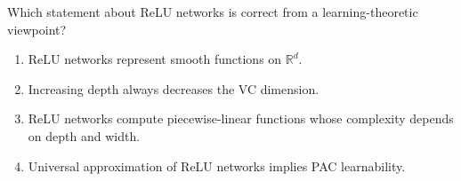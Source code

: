 \begin{exercise}
\label{ex:mlu-relu-mcq}
Which statement about ReLU networks is correct from a learning-theoretic viewpoint?
\begin{enumerate}[label=(\alph*)]
    \item ReLU networks represent smooth functions on $\mathbb{R}^d$.
    \item Increasing depth always decreases the VC dimension.
    \item ReLU networks compute piecewise-linear functions whose complexity depends on depth and width.
    \item Universal approximation of ReLU networks implies PAC learnability.
\end{enumerate}
\end{exercise}

